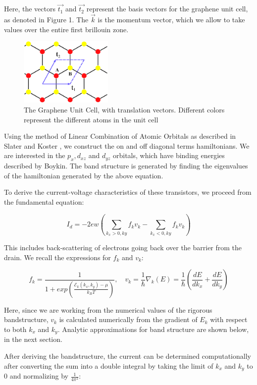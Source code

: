 \documentclass[11pt]{article}
\begin{document}
Here, the vectors $\vec{t_1}$ and $\vec{t_2}$ represent the basis vectors for the graphene unit cell, as denoted in Figure 1. The $\vec{k}$ is the momentum vector, which we allow to take values over the entire first brillouin zone. 

\begin{figure}[h!]
\centering
\includegraphics[width=0.4\textwidth]{graphene_unit_cell.png}
\caption{The Graphene Unit Cell, with translation vectors. Different colors represent the different atoms in the unit cell}
\end{figure}

Using the method of Linear Combination of Atomic Orbitals as described in Slater and Koster \cite{slaterkoster1954}, we construct the on and off diagonal terms hamiltonians. We are interested in the $p_{x}, d_{xz}$ and $d_{yz}$ orbitals, which have binding energies described by Boykin. \cite{boykin2011} The band structure is generated by finding the eigenvalues of the hamiltonian generated by the above equation. 

To derive the current-voltage characteristics of these transistors, we proceed from the fundamental equation:

$$I_d = -2ew(\sum_{k_x>0, ky}f_{k}v_{k} - \sum_{k_x<0, ky}f_{k}v_{k})$$

This includes back-scattering of electrons going back over the barrier from the drain. We recall the expressions for $f_{k}$ and $v_{k}$:

$$f_{k}=\frac{1}{1+exp(\frac{\mathcal{E}_{k}(k_x,k_y) - \mu}{k_BT})}, \hspace{1em} v_{k} = \frac{1}{\hbar}\nabla_k(E)= \frac{1}{\hbar}(\frac{dE}{dk_x}+\frac{dE}{dk_y})$$

Here, since we are working from the numerical values of the rigorous bandstructure, $v_k$ is calculated numerically from the gradient of $E_k$ with respect to both $k_x$ and $k_y$. Analytic approximations for band structure are shown below, in the next section. 

After deriving the bandstructure, the current can be determined computationally after converting the sum into a double integral by taking the limit of $k_x$ and $k_y$ to 0 and normalizing by $\frac{1}{4\pi^2}$:
\end{document}
